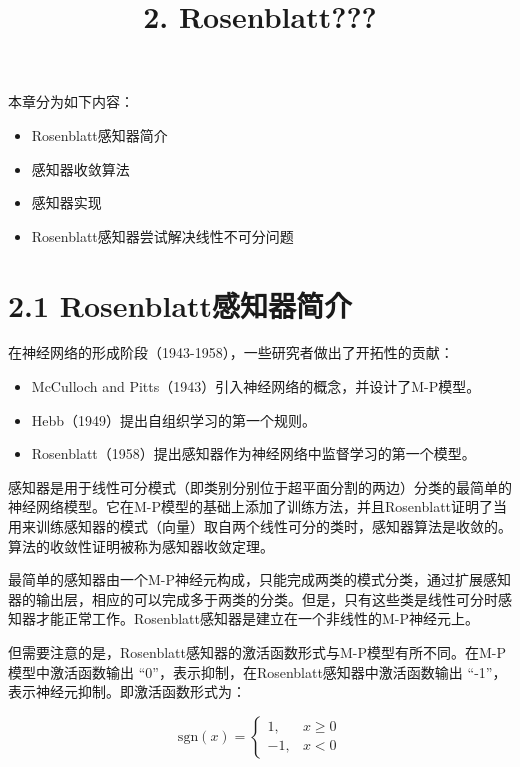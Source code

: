 \documentclass[11pt]{article}
\title{2. Rosenblatt???}
\providecommand{\tightlist}{%
      \setlength{\itemsep}{0pt}\setlength{\parskip}{0pt}}
\begin{document}
    
    
    \maketitle
    
    

    
    本章分为如下内容：

\begin{itemize}
\tightlist
\item
  Rosenblatt感知器简介
\item
  感知器收敛算法
\item
  感知器实现
\item
  Rosenblatt感知器尝试解决线性不可分问题
\end{itemize}

    \section{2.1
Rosenblatt感知器简介}\label{rosenblattux611fux77e5ux5668ux7b80ux4ecb}

在神经网络的形成阶段（1943-1958），一些研究者做出了开拓性的贡献：

\begin{itemize}
\tightlist
\item
  McCulloch and Pitts（1943）引入神经网络的概念，并设计了M-P模型。
\item
  Hebb（1949）提出自组织学习的第一个规则。
\item
  Rosenblatt（1958）提出感知器作为神经网络中监督学习的第一个模型。
\end{itemize}

感知器是用于线性可分模式（即类别分别位于超平面分割的两边）分类的最简单的神经网络模型。它在M-P模型的基础上添加了训练方法，并且Rosenblatt证明了当用来训练感知器的模式（向量）取自两个线性可分的类时，感知器算法是收敛的。算法的收敛性证明被称为感知器收敛定理。

最简单的感知器由一个M-P神经元构成，只能完成两类的模式分类，通过扩展感知器的输出层，相应的可以完成多于两类的分类。但是，只有这些类是线性可分时感知器才能正常工作。Rosenblatt感知器是建立在一个非线性的M-P神经元上。

但需要注意的是，Rosenblatt感知器的激活函数形式与M-P模型有所不同。在M-P模型中激活函数输出
``0''，表示抑制，在Rosenblatt感知器中激活函数输出
``-1''，表示神经元抑制。即激活函数形式为：

\[\begin{equation}\mathrm{sgn}(x)=\begin{cases}1, & x \geq 0\\ -1, & x < 0 \end{cases}\end{equation}\]
\end{document}
